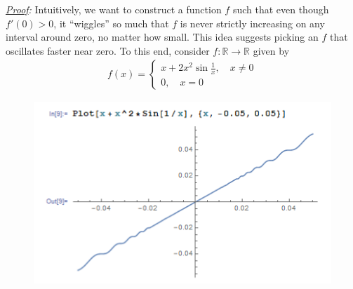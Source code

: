 \documentclass[11pt]{article}
\newcommand{\f}[2]{\frac{#1}{#2}}
\begin{document}
\begin{enumerate}[(a)]
	
	\noindent \textit{\underline{Proof}:} Intuitively, we want to construct a function $f$ such that even though $f'(0) >0$, it ``wiggles'' so much that $f$ is never strictly increasing on any interval around zero, no matter how small. This idea suggests picking an $f$ that oscillates faster near zero. To this end, consider $f: \mathbb{R} \to \mathbb{R}$ given by
	\begin{align*}
	f(x) = \begin{cases}
	x + 2x^2\sin\f{1}{x},\quad x \neq 0\\
	0,\quad x=0
	\end{cases}
	\end{align*}
	\begin{figure}[!htb]
		\centering
		\includegraphics[scale=0.35]{f}
	\end{figure}
	

\end{enumerate}
\end{document}
